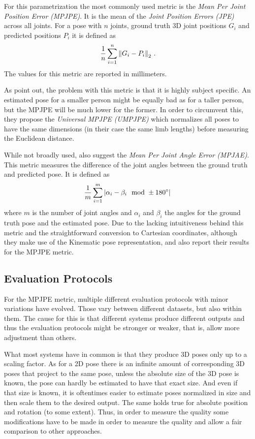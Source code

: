 For this parametrization the most commonly used metric is the \emph{Mean Per Joint Position Error (MPJPE)}.
It is the mean of the \emph{Joint Position Errors (JPE)} across all joints.
For a pose with $n$ joints, ground truth 3D joint positions $G_i$ and predicted positions $P_i$ it is defined as
\begin{equation}
\frac{1}{n} \sum_{i = 1}^{n}  \norm{G_i - P_i}_2 \ .
\end{equation}
The values for this metric are reported in millimeters.

As \citet{ionescu14} point out, the problem with this metric is that it is highly subject specific.
An estimated pose for a smaller person might be equally bad as for a taller person, but the MPJPE will be much lower for the former.
In order to circumvent this, they propose the \emph{Universal MPJPE (UMPJPE)} which normalizes all poses to have the same dimensions (in their case the same limb lengths) before measuring the Euclidean distance.

While not broadly used, \citet{ionescu14} also suggest the \emph{Mean Per Joint Angle Error (MPJAE)}.
This metric measures the difference of the joint angles between the ground truth and predicted pose.
It is defined as
\begin{equation}
\frac{1}{m} \sum_{i = 1}^{m} \abs{\alpha_i - \beta_i \mod \pm 180\degree} \,
\end{equation}
where $m$ is the number of joint angles and $\alpha_i$ and $\beta_i$ the angles for the ground truth pose and the estimated pose.
Due to the lacking intuitiveness behind this metric and the straightforward conversion to Cartesian coordinates, although they make use of the Kinematic pose representation, \citet{jahangiri17} and \citet{zhou16_2} also report their results for the MPJPE metric.

\subsection{Evaluation Protocols}

For the MPJPE metric, multiple different evaluation protocols with minor variations have evolved.
Those vary between different datasets, but also within them.
The cause for this is that different systems produce different outputs and thus the evaluation protocols might be stronger or weaker, that is, allow more adjustment than others.

What most systems have in common is that they produce 3D poses only up to a scaling factor.
As for a 2D pose there is an infinite amount of corresponding 3D poses that project to the same pose, unless the absolute size of the 3D pose is known, the pose can hardly be estimated to have that exact size.
And even if that size is known, it is oftentimes easier to estimate poses normalized in size and then scale them to the desired output.
The same holds true for absolute position and rotation (to some extent).
Thus, in order to measure the quality some modifications have to be made in order to measure the quality and allow a fair comparison to other approaches.

